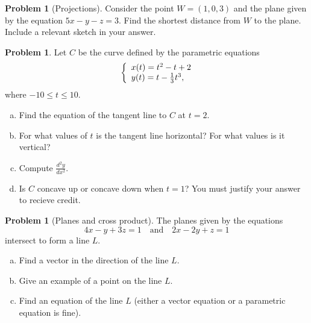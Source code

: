 \documentclass[10pt]{article}
\theoremstyle{definition}
\newtheorem{problem}[theorem]{Problem}
\newcommand{\1}[1]{\textbf{1}_{\left[#1\right]}} %
\begin{document}
\begin{problem}[Projections]
  Consider the point $W=(1,0,3)$ and the plane given by the equation $5x-y-z=3$.
  Find the shortest distance from $W$ to the plane. Include a relevant sketch in
  your answer.
\end{problem}


\begin{problem}%
  Let $C$ be the curve defined by the parametric equations
  \begin{equation*}
    \left\{ \begin{array}{l@{}l} x(t)=t^{2}-t+2 \\ y(t) = t-\frac{1}{3}t^{3}, \end{array}\right.
  \end{equation*}
  where $-10 \leq t \leq 10$.
  \begin{enumerate}[(a)]
    \item Find the equation of the tangent line to $C$ at $t=2$.
    \item For what values of $t$ is the tangent line horizontal? For what values is it vertical?
    \item Compute $\frac{d^{2}y}{dx^{2}}$.
    \item Is $C$ concave up or concave down when $t=1$? You must justify your answer to recieve credit.
  \end{enumerate}
\end{problem}

\begin{problem}[Planes and cross product]
  The planes given by the equations
  \begin{equation*}
    4x-y+3z = 1 \quad \text{and} \quad  2x-2y+z=1
  \end{equation*}
  intersect to form a line $L$. 
  \begin{enumerate}[(a)]
    \item Find a vector in the direction of the line $L$.
    \item Give an example of a point on the line $L$.
    \item Find an equation of the line $L$ (either a vector equation or a parametric equation is fine).
  \end{enumerate}
\end{problem}
\end{document}
